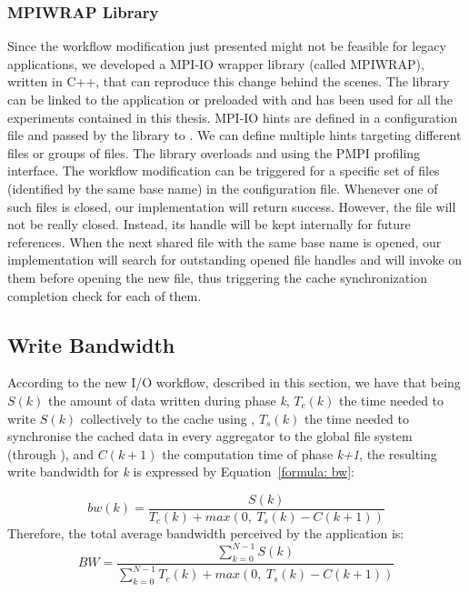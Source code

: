 \subsubsection{MPIWRAP Library}
Since the workflow modification just presented might not be feasible for legacy applications, we developed a MPI-IO wrapper library (called MPIWRAP), written in C++, that can reproduce this change behind the scenes. 
The library can be linked to the application or preloaded with  and has been used for all the experiments contained in this thesis. MPI-IO hints are defined in a configuration file and passed 
by the library to . We can define multiple hints targeting different files or groups of files. The library overloads  and  
using the PMPI profiling interface. The workflow modification can be triggered for a specific set of files (identified by the same base name) in the configuration file. Whenever one of such files is closed, our  
implementation will return success. However, the file will not be really closed. Instead, its handle will be kept internally for future references. When the next shared file with the same base name is opened, our 
 implementation will search for outstanding opened file handles and will invoke  on them before opening the new file, thus triggering the cache synchronization 
completion check for each of them.

\subsection{Write Bandwidth}
According to the new I/O workflow, described in this section, we have that being $S(k)$ the amount of data written during phase \textit{k}, $T_c(k)$ the time needed to write $S(k)$ collectively to the cache using 
, $T_s(k)$ the time needed to synchronise the cached data in every aggregator to the global file system (through ), and $C(k+1)$ the 
computation time of phase \textit{k+1}, the resulting write bandwidth for \textit{k} is expressed by Equation~\ref{formula: bw}:

\begin{equation}\label{formula: bw}
        bw(k) = \frac{S(k)}{T_c(k) + max(0,\ T_s(k) - C(k+1))}
\end{equation}
Therefore, the total average bandwidth perceived by the application is:
\begin{equation}\label{formula: abw}
        BW = \frac{\sum_{k=0}^{N-1} S(k)}{\sum_{k=0}^{N-1} T_c(k) + max(0,\ T_s(k) - C(k+1))}
\end{equation}

